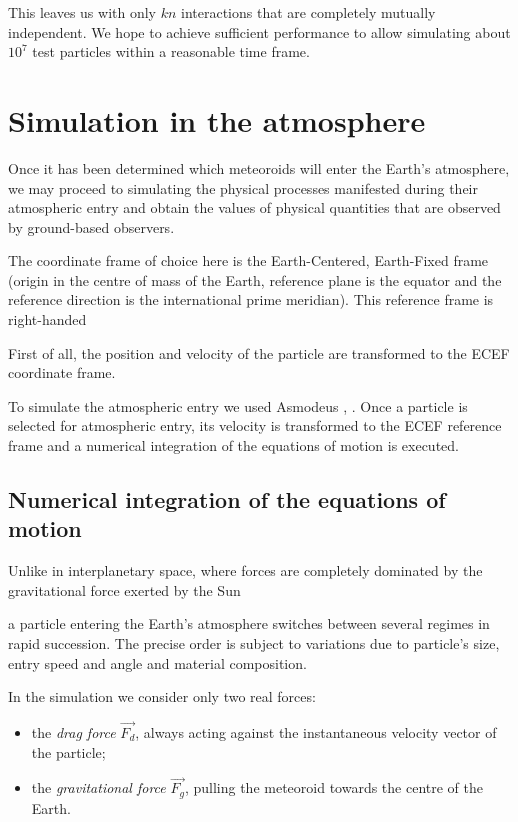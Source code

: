             This leaves us with only $kn$ interactions that are completely mutually independent.
            We hope to achieve sufficient performance to allow simulating about $10^7$ test particles within
            a reasonable time frame.

\section{Simulation in the atmosphere} \label{aa}
    Once it has been determined which meteoroids will enter the Earth's atmosphere, we may proceed to simulating
    the physical processes manifested during their atmospheric entry and obtain the values of physical quantities
    that are observed by ground-based observers.

    The coordinate frame of choice here is the Earth-Centered, Earth-Fixed frame (origin in the centre of mass of the Earth,
    reference plane is the equator and the reference direction is the international prime meridian).
    This reference frame is right-handed

    First of all, the position and velocity of the particle are transformed to the ECEF coordinate frame.

    To simulate the atmospheric entry we used Asmodeus \citep{balaz-thesis}, \citep{balaz+2020}.
    Once a particle is selected for atmospheric entry, its velocity is transformed to the ECEF reference frame
    and a numerical integration of the equations of motion is executed.

    \subsection{Numerical integration of the equations of motion} \label{aai}
        Unlike in interplanetary space, where forces are completely dominated by the gravitational force
        exerted by the Sun

        a particle entering the Earth's atmosphere switches between several regimes in rapid succession.
        The precise order is subject to variations due to particle's size, entry speed and angle
        and material composition.


        In the simulation we consider only two real forces:
        \begin{itemize}
            \item the \emph{drag force} $\vec{F_d}$, always acting against the instantaneous velocity vector of the particle;
            \item the \emph{gravitational force} $\vec{F_g}$, pulling the meteoroid towards the centre of the Earth.
        \end{itemize}

